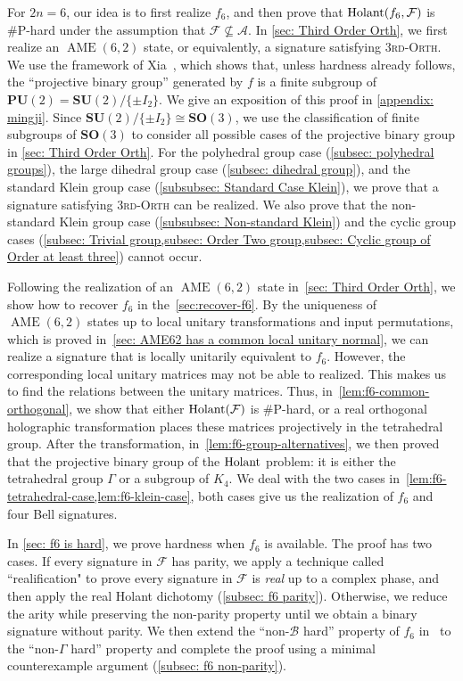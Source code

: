 For $2n=6$, our idea is to first realize $f_6$, and then prove that $\operatorname{Holant}(f_6,\mathcal{F})$ is \#P-hard under the assumption that $\mathcal{F}\not\subseteq\mathscr{A}$.
In \cref{sec: Third Order Orth}, we first realize an $\operatorname{AME}(6,2)$ state, or equivalently, a signature satisfying \textsc{3rd-Orth}.
We use the framework of Xia~\cite{MingjiProgram}, which shows that, unless hardness already follows, the ``projective binary group'' generated by $f$ is a finite subgroup of $\mathbf{PU}(2)=\mathbf{SU}(2)/\{\pm I_2\}$.
We give an exposition of this proof in \autoref{appendix: mingji}.
Since $\mathbf{SU}(2)/\{\pm I_2\}\cong\mathbf{SO}(3)$, we use the classification of finite subgroups of $\mathbf{SO}(3)$ to consider all possible cases of the projective binary group in \cref{sec: Third Order Orth}.
For the polyhedral group case (\cref{subsec: polyhedral groups}), the large dihedral group case (\cref{subsec: dihedral group}), and the standard Klein group case (\cref{subsubsec: Standard Case Klein}), we prove that a signature satisfying \textsc{3rd-Orth} can be realized.
We also prove that the non-standard Klein group case (\cref{subsubsec: Non-standard Klein}) and the cyclic group cases (\cref{subsec: Trivial group,subsec: Order Two group,subsec: Cyclic group of Order at least three}) cannot occur.


Following the realization of an $\operatorname{AME}(6,2)$ state in~\cref{sec: Third Order Orth}, we show how to recover $f_6$ in the~\cref{sec:recover-f6}. By the uniqueness of $\operatorname{AME}(6,2)$ states up to local
unitary transformations and input permutations, which is proved in~\cref{sec: AME62 has a common local unitary normal}, we can realize a signature that is locally unitarily equivalent to $f_6$. However, the corresponding local unitary matrices may not be able to realized. This makes us to find the relations between the unitary matrices. Thus, in~\cref{lem:f6-common-orthogonal}, we show that either $\operatorname{Holant}(\mathcal{F})$ is \#P-hard, or a real orthogonal holographic transformation places these matrices projectively in the tetrahedral group. After the transformation, in~\cref{lem:f6-group-alternatives}, we then proved that the projective binary group of the $\operatorname{Holant}$ problem: it is either the tetrahedral group $\Gamma$ or a subgroup of $K_4$. We deal with the two cases in~\cref{lem:f6-tetrahedral-case,lem:f6-klein-case}, both cases give us the realization of $f_6$ and four Bell signatures. 

In \cref{sec: f6 is hard}, we prove hardness when $f_6$ is available.
The proof has two cases.
If every signature in $\mathcal{F}$ has parity, we apply a technique called ``realification" to prove every signature in $\mathcal{F}$ is \emph{real} up to a complex phase, and then apply the real Holant dichotomy (\cref{subsec: f6 parity}).
Otherwise, we reduce the arity while preserving the non-parity property until we obtain a binary signature without parity.
We then extend the ``non-$\mathcal{B}$ hard'' property of $f_6$ in~\cite{realholant} to the ``non-$\Gamma$ hard'' property and complete the proof using a minimal counterexample argument (\cref{subsec: f6 non-parity}).

